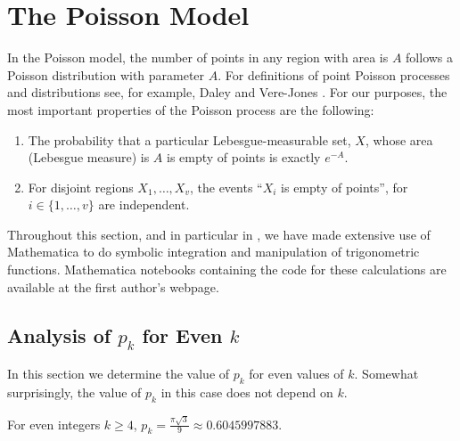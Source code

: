 \documentclass[twoside,leqno,twocolumn]{article}
\begin{document}
\section{The Poisson Model}

In the Poisson model, the number of points in any region with area is $A$
follows a Poisson distribution with parameter $A$.  For definitions of
point Poisson processes and distributions see, for example, Daley and
Vere-Jones \cite[Chapter~2]{daley.vere-jones:introduction}.  For our
purposes, the most important properties of the Poisson process are
the following:
\begin{enumerate}
\item The probability that a particular Lebesgue-measurable set, $X$,
   whose area (Lebesgue measure) is $A$ is empty of points is exactly
   $e^{-A}$.
\item For disjoint regions $X_1,\ldots,X_v$, the events ``$X_i$ is empty
   of points'', for $i\in\{1,\ldots,v\}$ are independent.
\end{enumerate}

Throughout this section, and in particular in , we have made
extensive use of Mathematica to do symbolic integration and manipulation
of trigonometric functions.  Mathematica notebooks containing the code
for these calculations are available at the first author's webpage.

\subsection{Analysis of $p_k$ for Even $k$}

In this section we determine the value of $p_k$ for even values of $k$.
Somewhat surprisingly, the value of $p_k$ in this case does not depend on $k$.

\begin{lem}
 For even integers $k\ge 4$, $p_k=\frac{\pi\sqrt{3}}{9}\approx 0.6045997883$.
\end{lem}
\end{document}
